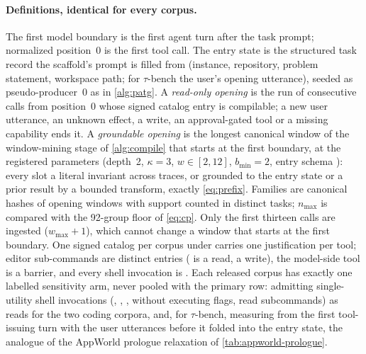 \paragraph{Definitions, identical for every corpus.}
The first model boundary is the first agent turn after the task prompt;
normalized position~0 is the first tool call. The entry state is the structured
task record the scaffold's prompt is filled from (instance, repository,
problem statement, workspace path; for $\tau$-bench the user's opening
utterance), seeded as pseudo-producer~0 as in \cref{alg:patg}. A
\emph{read-only opening} is the run of consecutive calls from position~0 whose
signed catalog entry is compilable; a new user utterance, an unknown effect, a
write, an approval-gated tool or a missing capability ends it. A
\emph{groundable opening} is the longest canonical window of the window-mining
stage of \cref{alg:compile} that starts at the first boundary, at the
registered parameters (depth~2, $\kappa=3$,
$w\in[2,12]$, $b_{\min}=2$, entry schema ): every slot a literal
invariant across traces, or grounded to the entry state or a prior result by a
bounded transform, exactly \cref{eq:prefix}. Families are canonical hashes of
opening windows with support counted in distinct tasks; $n_{\max}$ is compared
with the 92-group floor of \cref{eq:cp}. Only the first thirteen calls are
ingested ($w_{\max}+1$), which cannot change a window that starts at the first
boundary. One signed catalog per corpus under
 carries one justification per tool; editor sub-commands are distinct entries
( is a read,  a write), the model-side
 tool is a barrier, and every shell invocation is . Each
released corpus has exactly one labelled sensitivity arm, never pooled with the
primary row: admitting single-utility shell invocations (, ,
,  without executing flags, read  subcommands)
as reads for the two coding corpora, and, for $\tau$-bench, measuring from the
first tool-issuing turn with the user utterances before it folded into the
entry state, the analogue of the AppWorld prologue relaxation of
\cref{tab:appworld-prologue}.

\begin{table}[t]
  \centering
  \caption{Prefix census. RO$\ge$2: share of trajectories whose read-only
  opening has at least two calls; Ground.\ $\ge$2: share whose longest
  groundable opening window has at least two calls; Med.\ len: median length of
  those windows; Fam.\ / floor: opening families and those with $\ge3$ supporting
  tasks (the stage-2 minimum of \cref{tab:funnel}); $n_{\max}$: largest family
  support, $\dagger$ at or above the 92-group floor. Indented rows are the
  labelled sensitivity arms. AppWorld's released logs retain no responses, so
  only its read-only column is measurable (its gold-solution substrate reaches
  $n_{\max}=136$, \cref{tab:funnel}). Trajectories repeat tasks and are
  descriptive counts, not independent samples.}
  \label{tab:prefix-census}
  \footnotesize
  \setlength{\tabcolsep}{3.5pt}
  \resizebox{\linewidth}{!}{}
\end{table}

